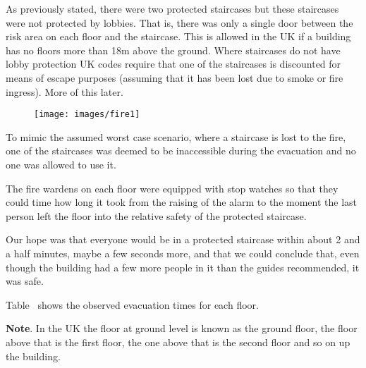 \documentclass{style/llncs}
\begin{document}
\noindent{}As previously stated, there were two protected staircases but these staircases were not protected by lobbies.  That is, there was only a single door between the risk area on each floor and the staircase.  This is allowed in the UK if a building has no floors more than 18m above the ground.  Where staircases do not have lobby protection UK codes require that one of the staircases is discounted for means of escape purposes (assuming that it has been lost due to smoke or fire ingress).  More of this later.%

\begin{figure}[tbp]%
\begin{mdcenter}%

\noindent{}\texttt{[image: images/fire1]}{}%

\mdhr{}%

\noindent{}%
\end{mdcenter}\label{fig-3}%
\end{figure}%

\noindent{}To mimic the assumed worst case scenario, where a staircase is lost to the fire, one of the staircases was deemed to be inaccessible during the evacuation and no one was allowed to use it.%

The fire wardens on each floor were equipped with stop watches so that they could time how long it took from the raising of the alarm to the moment the last person left the floor into the relative safety of the protected staircase.%

Our hope was that everyone would be in a protected staircase within about 2 and a half minutes, maybe a few seconds more, and that we could conclude that, even though the building had a few more people in it than the guides recommended, it was safe.%

Table~ shows the observed evacuation times for each floor.%

\noindent{}\textbf{Note}.
In the UK the floor at ground level is known as the ground floor, the floor above that is the first floor, the one above that is the second floor and so on up the building.%
\end{document}
